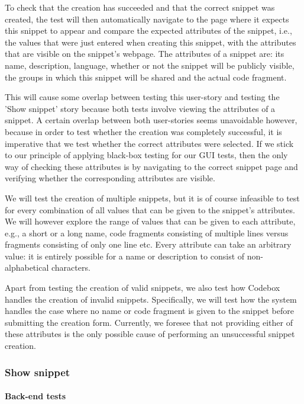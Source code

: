 \documentclass[10pt,a4paper,BCOR12mm, headexclude, footexclude,
  twoside, openright]{scrartcl}
\numberwithin{equation}{section} %
\numberwithin{figure}{section} %
\numberwithin{table}{section} %
\begin{document}
To check that the creation has succeeded and that the correct snippet was created, the test will then automatically navigate to the page where it expects this snippet to appear and compare the expected attributes of the snippet, i.e., the values that were just entered when creating this snippet, with the attributes that are visible on the snippet's webpage.
The attributes of a snippet are: its name, description, language, whether or not the snippet will be publicly visible, the groups in which this snippet will be shared and the actual code fragment.

This will cause some overlap between testing this user-story and testing the 'Show snippet' story because both tests involve viewing the attributes of a snippet.
A certain overlap between both user-stories seems unavoidable however, because in order to test whether the creation was completely successful, it is imperative that we test whether the correct attributes were selected.
If we stick to our principle of applying black-box testing for our GUI tests, then the only way of checking these attributes is by navigating to the correct snippet page and verifying whether the corresponding attributes are visible.

We will test the creation of multiple snippets, but it is of course infeasible to test for every combination of all values that can be given to the snippet's attributes.
We will however explore the range of values that can be given to each attribute, e.g., a short or a long name, code fragments consisting of multiple lines versus fragments consisting of only one line etc.
Every attribute can take an arbitrary value: it is entirely possible for a name or description to consist of non-alphabetical characters.

Apart from testing the creation of valid snippets, we also test how Codebox handles the creation of invalid snippets.
Specifically, we will test how the system handles the case where no name or code fragment is given to the snippet before submitting the creation form.
Currently, we foresee that not providing either of these attributes is the only possible cause of performing an unsuccessful snippet creation. 

\subsubsection*{Show snippet}
\paragraph{Back-end tests}
\end{document}
